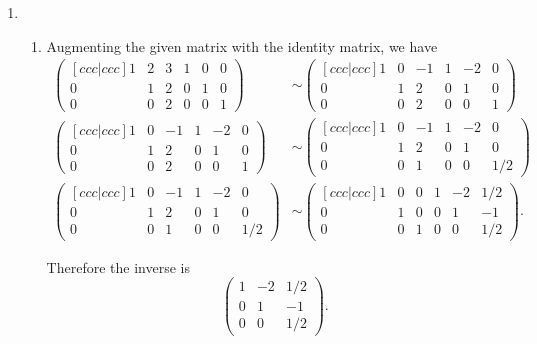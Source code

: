 \documentclass[a4paper]{article}
\begin{document}
\begin{enumerate}
		\item
		\begin{enumerate}
			\item Augmenting the given matrix with the identity matrix, we have
			\begin{align*}
				\begin{pmatrix}[ccc|ccc]
					1 & 2 & 3		& 1 & 0 & 0 \\
					0 & 1 & 2		& 0 & 1 & 0 \\
					0 & 0 & 2		& 0 & 0 & 1
				\end{pmatrix}
				& \sim
				\begin{pmatrix}[ccc|ccc]
					1 & 0 & -1		& 1 & -2 & 0 \\
					0 & 1 &  2		& 0 &  1 & 0 \\
					0 & 0 &  2		& 0 &  0 & 1
				\end{pmatrix} \\
				\begin{pmatrix}[ccc|ccc]
					1 & 0 & -1		& 1 & -2 & 0 \\
					0 & 1 &  2		& 0 &  1 & 0 \\
					0 & 0 &  2		& 0 &  0 & 1
				\end{pmatrix}
				& \sim
				\begin{pmatrix}[ccc|ccc]
					1 & 0 & -1		& 1 & -2 &   0 \\
					0 & 1 &  2		& 0 &  1 &   0 \\
					0 & 0 &  1		& 0 &  0 & 1/2
				\end{pmatrix} \\
				\begin{pmatrix}[ccc|ccc]
					1 & 0 & -1		& 1 & -2 &   0 \\
					0 & 1 &  2		& 0 &  1 &   0 \\
					0 & 0 &  1		& 0 &  0 & 1/2
				\end{pmatrix}
				& \sim
				\begin{pmatrix}[ccc|ccc]
					1 & 0 &  0		& 1 & -2 & 1/2 \\
					0 & 1 &  0		& 0 &  1 &  -1 \\
					0 & 0 &  1		& 0 &  0 & 1/2
				\end{pmatrix}.
			\end{align*}
			
			Therefore the inverse is
			\begin{equation*}
				\begin{pmatrix}
					1 & -2 & 1/2 \\
					0 &  1 &  -1 \\
					0 &  0 & 1/2
				\end{pmatrix}.
			\end{equation*}
			

\end{enumerate}
\end{enumerate}
\end{document}
